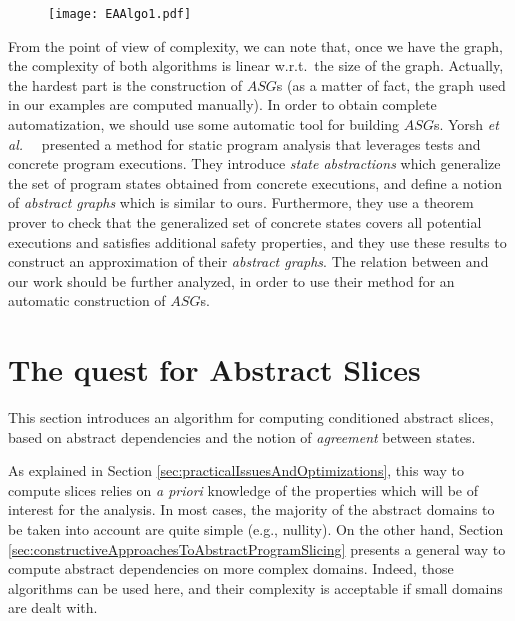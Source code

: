 \documentclass[prodmode,acmtocl]{acmsmall}
\def\ASG{\ensuremath{\mathit{ASG}}\xspace}
\def\etal{{\it et al.\ }}
\newcommand{\0}{\mbox{\bf 0}}
\begin{document}
{\begin{figure}[h]
 \centering
    \texttt{[image: EAAlgo1.pdf]}
  \caption{ \label{fig:EAAlgo}}
\end{figure}
From the point of view of complexity, we can note that, once we have
the graph, the complexity of both algorithms is linear w.r.t.~the size
of the graph.  Actually, the hardest part is the construction of
$\ASG$s (as a matter of fact, the graph used in our examples are
computed manually).  In order to obtain complete automatization, we
should use some automatic tool for building $\ASG$s.  Yorsh
\etal~\cite{YorshBallSagiv} presented a method for static program
analysis that leverages tests and concrete program executions.  They
introduce \emph{state abstractions} which generalize the set of
program states obtained from concrete executions, and define a notion
of \emph{abstract graphs} which is similar to ours.  Furthermore, they
use a theorem prover to check that the generalized set of concrete
states covers all potential executions and satisfies additional safety
properties, and they use these results to construct an approximation
of their \emph{abstract graphs}.  The relation between
\cite{YorshBallSagiv} and our work should be further analyzed, in
order to use their method for an automatic construction of $\ASG$s.}



\section{The quest for Abstract Slices}
\label{sec:theQuestForAbstractSlices}
This section introduces an algorithm for computing conditioned
abstract slices, based on abstract dependencies and the notion of
\emph{agreement} between states.

As explained in Section \ref{sec:practicalIssuesAndOptimizations},
this way to compute slices relies on \emph{a priori} knowledge of the
properties which will be of interest for the analysis.  In most cases,
the majority of the abstract domains to be taken into account are
quite simple (e.g., nullity).  On the other hand, Section
\ref{sec:constructiveApproachesToAbstractProgramSlicing} presents a
general way to compute abstract dependencies on more complex domains.
Indeed, those algorithms can be used here, and their complexity is
acceptable if small domains are dealt with.
\end{document}
